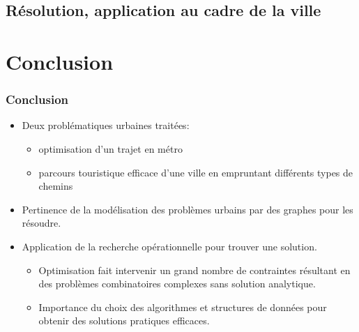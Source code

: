 \documentclass[10pt]{beamer}
\begin{document}
\begin{frame}


\end{frame} 

\subsection{Résolution, application au cadre de la ville}



\section{Conclusion}

\begin{frame}
\frametitle{Conclusion}
\begin{itemize}
\item Deux problématiques urbaines traitées: 
  \begin{itemize}
  \item optimisation d'un trajet en métro
  \item parcours touristique efficace d'une ville en empruntant différents types de chemins
  \end{itemize}
\item Pertinence de la modélisation des problèmes urbains par des graphes pour les résoudre.
\item Application de la recherche opérationnelle pour trouver une solution.
  \begin{itemize}
  \item Optimisation fait intervenir un grand nombre de contraintes
résultant en des problèmes combinatoires complexes sans solution analytique.
  \item Importance du choix des algorithmes et structures de données pour obtenir des solutions pratiques efficaces.
  \end{itemize}
\end{itemize}
\end{frame}
\end{document}
